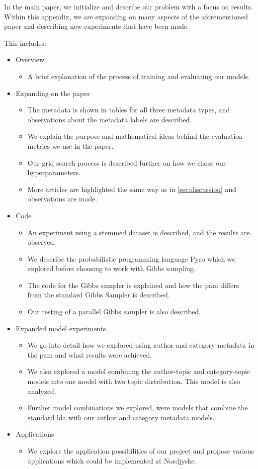In the main paper, we initialize and describe our problem with a focus on results. 
Within this appendix, we are expanding on many aspects of the aforementioned paper and describing new experiments that have been made.

This includes:
\begin{itemize}
	\item Overview
	\begin{itemize}
		\item A brief explanation of the process of training and evaluating our models.
	\end{itemize}
	\item Expanding on the paper
	\begin{itemize}
		\item The metadata is shown in tables for all three metadata types, and observations about the metadata labels are described.
		\item We explain the purpose and mathematical ideas behind the evaluation metrics we use in the paper.
		\item Our grid search process is described further on how we chose our hyperparameters.
		\item More articles are highlighted the same way as in \autoref{sec:discussion} and observations are made.
	\end{itemize}
	\item Code
	\begin{itemize}
		\item An experiment using a stemmed dataset is described, and the results are observed.
		\item We describe the probabilistic programming language Pyro which we explored before choosing to work with Gibbs sampling.
		\item The code for the Gibbs sampler is explained and how the \gls{pam} differs from the standard Gibbs Sampler is described. 
		\item Our testing of a parallel Gibbs sampler is also described.
	\end{itemize}
	\item Expanded model experiments
	\begin{itemize}
		\item We go into detail how we explored using author and category metadata in the \gls{pam} and what results were achieved.
		\item We also explored a model combining the author-topic and category-topic models into one model with two topic distribution. This model is also analyzed.
		\item Further model combinations we explored, were models that combine the standard \gls{lda} with our author and category metadata models.
	\end{itemize}
	\item Applications
	\begin{itemize}
		\item We explore the application possibilities of our project and propose various applications which could be implemented at Nordjyske.
	\end{itemize}
\end{itemize}
